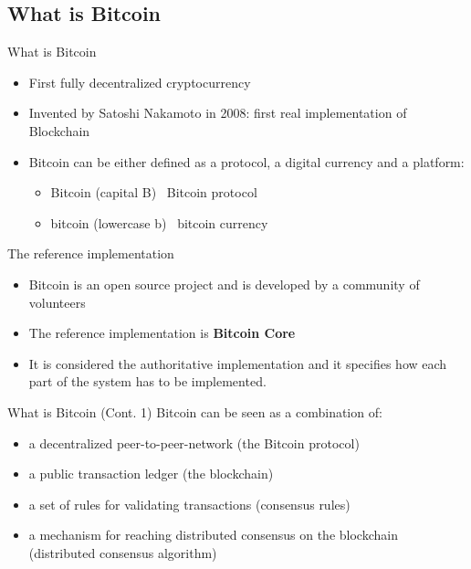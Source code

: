 \documentclass{beamer}
\begin{document}
  \subsection{What is Bitcoin}
  \begin{frame}{What is Bitcoin}
    \begin{itemize}
      \item First fully decentralized cryptocurrency 
      \item Invented by Satoshi Nakamoto in 2008: first real implementation of
      Blockchain 
      \item Bitcoin can be either defined as a protocol, a digital currency
      and a platform: 
      \begin{itemize}
        \item Bitcoin (capital B)  \MVRightarrow\, Bitcoin protocol
        \item bitcoin (lowercase b) \MVRightarrow\, bitcoin  currency
      \end{itemize} \pause
    \end{itemize}

    \begin{block}{The reference implementation}
      \begin{itemize}
        \item Bitcoin is an open source project and is developed by a community of volunteers
        \item The reference implementation is \textbf{Bitcoin Core}
        \item It is considered the authoritative implementation and it specifies
        how each part of the system has to be implemented.
      \end{itemize}
    \end{block}
  \end{frame}




  \begin{frame}{What is Bitcoin (Cont. 1)}
    Bitcoin can be seen as a combination of:
    \begin{itemize}
      \item a decentralized peer-to-peer-network (the Bitcoin protocol)
      \item a public transaction ledger (the blockchain) 
      \item a set of rules for validating transactions (consensus rules) 
      \item a mechanism for reaching distributed consensus on the blockchain
      (distributed consensus algorithm) 
    \end{itemize}
  \end{frame}
\end{document}
